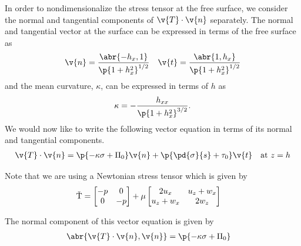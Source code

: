   In order to nondimensionalize the stress tensor at the free surface, we consider the
  normal and tangential components of \(\v{T} \cdot \v{n}\) separately.
  The normal and tangential vector at the surface can be expressed in terms of the free
  surface as
  \begin{gather}
    \v{n} = \frac{\abr{-h_x, 1}}{\p{1 + h_x^2}^{1/2}} \quad
    \v{t} = \frac{\abr{1, h_x}}{\p{1 + h_x^2}^{1/2}}
  \end{gather}
  and the mean curvature, \(\kappa \), can be expressed in terms of \(h\) as
  \begin{equation}
    \kappa = -\frac{h_{xx}}{\p{1 + h_x^2}^{3/2}}.
  \end{equation}
  We would now like to write the following vector equation in terms of its normal and
  tangential components.
  \begin{align*}
    \v{T} \cdot \v{n} &= \p{-\kappa \sigma + \Pi_0}\v{n}
      + \p{\pd{\sigma}{s} + \tau_0}\v{t} &\text{at } z = h
  \end{align*}

  Note that we are using a Newtonian stress tensor which is given by
  \begin{align}
    \v{T} &=
    \begin{bmatrix}
      -p & 0 \\
      0 & -p
    \end{bmatrix} +
    \mu \begin{bmatrix}
      2u_x & u_z + w_x \\
      u_z + w_x & 2w_z
    \end{bmatrix}
  \end{align}

  The normal component of this vector equation is given by
  \begin{align}
    \abr{\v{T} \cdot \v{n}, \v{n}} &= \p{-\kappa \sigma + \Pi_0}
  \end{align}

